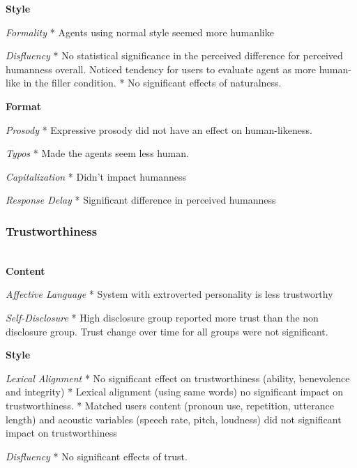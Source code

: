 \documentclass[sigconf,screen,review, anonymous]{acmart}
\newcommand{\cmt}[1]{}%
\begin{document}
%
\textbf{Style}

\textit{Formality}
* Agents using normal style seemed more humanlike \cite{ouchi2019should}\cmt{[59]}

\textit{Disfluency}
* No statistical significance in the perceived difference for perceived humanness overall. Noticed tendency for users to evaluate agent as more human-like in the filler condition. \cite{jeong2019exploring}\cmt{[10]}
* No significant effects of naturalness. \cite{pfeifer2009should}\cmt{[12]}

%
\textbf{Format}

\textit{Prosody}
* Expressive prosody did not have an effect on human-likeness. \cite{zhu2022effects}\cmt{[26]}

\textit{Typos}
* Made the agents seem less human. \cite{westerman2019believe}\cmt{[9]}

\textit{Capitalization}
* Didn't impact humanness \cite{westerman2019believe}\cmt{[9]}

\textit{Response Delay}
* Significant difference in perceived humanness \cite{gnewuch2018faster}\cmt{[19]}

\subsubsection{Trustworthiness \nopunct}
\hfill\\

\textbf{Content}

\textit{Affective Language}
* System with extroverted personality is less trustworthy \cite{andrews2012system}\cmt{[38]}

\textit{Self-Disclosure}
* High disclosure group reported more trust than the non disclosure group. Trust change over time for all groups were not significant. \cite{lee2020hear}\cmt{[23]}

%
\textbf{Style}

\textit{Lexical Alignment}
* No significant effect on trustworthiness (ability, benevolence and integrity) \cite{linnemann2018can}\cmt{[15]}
* Lexical alignment (using same words) no significant impact on trustworthiness. \cite{huiyang2022improving}\cmt{[17]}
* Matched users content (pronoun use, repetition, utterance length) and acoustic variables (speech rate, pitch, loudness) did not significant impact on trustworthiness \cite{hoegen2019end}\cmt{[31]}

\textit{Disfluency}
* No significant effects of trust. \cite{pfeifer2009should}\cmt{[12]}
\end{document}
